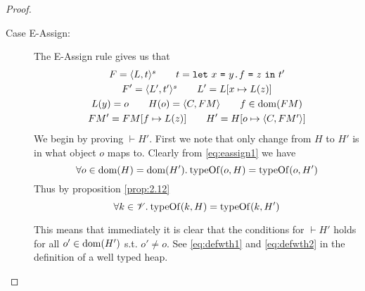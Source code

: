 \begin{proof}
\begin{description}
\begin{description}
\begin{description}
            \item[Case {\sc E-Assign}:] The {\sc E-Assign} rule gives us that
              \begin{equation} \label{eq:eassign1}
                \begin{gathered}
                  F = \mbox{$\langle L, t \rangle^s$} \quad\quad t = \mbox{\mdseries\texttt{let}~$x$~\texttt{=}~$\mbox{\mdseries$y$\texttt{.}$f$~\texttt{=}~$z$}$~\texttt{in}~$t'$} \\
                  F' = \mbox{$\langle L', t' \rangle^s$} \quad\quad L' = L[x \mapsto L(z)] \\
                  L(y) = o \quad\quad H(o) = \mbox{$\langle C, FM \rangle$} \quad\quad f \in \mbox{$\mathrm{dom}$}(FM)
                  \\
                  FM' = FM[f \mapsto L(z)] \quad\quad H' = H[o \mapsto \mbox{$\langle C, FM' \rangle$}]
                \end{gathered}
              \end{equation}
              We begin by proving $\vdash H'$. First we note
              that only change from $H$ to $H'$ is in what object $o$ maps to.
              Clearly from \eqref{eq:eassign1} we have
              \begin{equation} \label{eq:eassign2}
                \forall o \in \mbox{$\mathrm{dom}$}(H) = \mbox{$\mathrm{dom}$}(H'). \: \mbox{$\mathrm{typeOf}$}(o, H) = \mbox{$\mathrm{typeOf}$}(o,
                H')
              \end{equation}
              Thus by proposition \ref{prop:2.12} 
              \begin{equation} \label{eq:eassign3}
                \forall k \in \mathscr{V}. \: \mbox{$\mathrm{typeOf}$}(k, H) = \mbox{$\mathrm{typeOf}$}(k,
                H')
              \end{equation}

              \begin{addmargin}[1em]{1em}
                \begin{remark}
                  This means that immediately it is clear that the conditions for
                  $\vdash H'$ holds for all $o' \in \mbox{$\mathrm{dom}$}(H')$ s.t. $o' \neq o$.
                  See \eqref{eq:defwth1} and \eqref{eq:defwth2} in the
                  definition of a well typed heap.
                \end{remark}
              \end{addmargin}


\end{description}
\end{description}
\end{description}
\end{proof}
